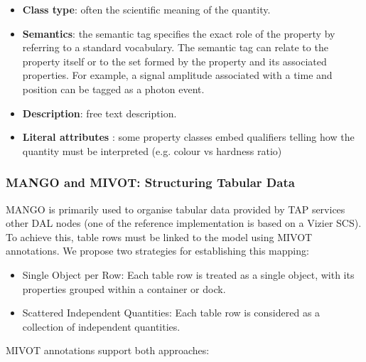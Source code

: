 \documentclass[11pt,a4paper]{ivoa}
\begin{document}
\begin{itemize}[noitemsep,topsep=0pt,parsep=0pt,partopsep=0pt]
    \item \textbf{Class type}: often the scientific meaning of the quantity.
    \item \textbf{Semantics}: the semantic tag specifies the exact role of the property by
          referring to a standard vocabulary. The semantic tag can relate to the property itself
          or to the set formed by the property and its associated properties.
          For example, a signal amplitude associated with a time and position can be tagged
          as a photon event.
    \item \textbf{Description}: free text description.
    \item \textbf{Literal attributes} : some property classes embed qualifiers telling 
          how the quantity must be interpreted (e.g. colour vs hardness ratio)
\end{itemize}


\subsubsection{MANGO and MIVOT: Structuring Tabular Data}

MANGO is primarily used to organise tabular data provided by TAP services \citep{2019ivoa.spec.0927D} 
other DAL nodes (one of the reference implementation is based on a Vizier SCS).
To achieve this, table rows must be linked to the model using MIVOT annotations.
We propose two strategies for establishing this mapping:
\begin{itemize}[noitemsep,topsep=0pt,parsep=0pt,partopsep=0pt]
    \item Single Object per Row: Each table row is treated as a single object,
          with its properties grouped within a container or dock.
    \item Scattered Independent Quantities: Each table row is considered as a collection of independent quantities.
\end{itemize}

\hfill \break

MIVOT annotations support both approaches:
\end{document}
